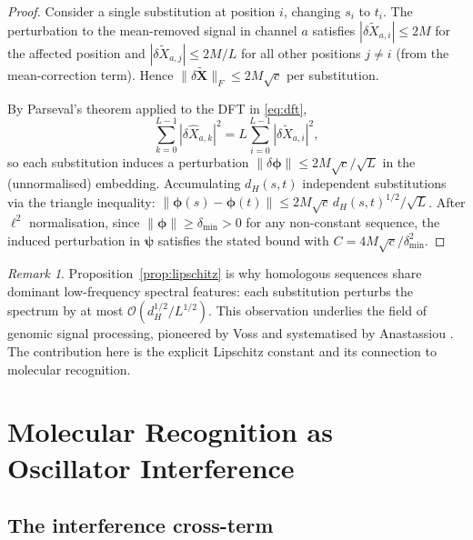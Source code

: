 \documentclass[twocolumn,11pt,a4paper]{article}
\theoremstyle{definition}
\theoremstyle{remark}
\newtheorem{remark}[theorem]{Remark}
\begin{document}
\begin{proof}
Consider a single substitution at position $i$, changing $s_i$ to $t_i$.
The perturbation to the mean-removed signal in channel $a$ satisfies
$|\delta\widetilde{X}_{a,i}| \leq 2M$ for the affected position and
$|\delta\widetilde{X}_{a,j}| \leq 2M/L$ for all other positions $j \neq i$
(from the mean-correction term). Hence
$\|\delta\widetilde{\mathbf{X}}\|_F \leq 2M\sqrt{c}$ per substitution.

By Parseval's theorem applied to the DFT in \eqref{eq:dft},
\[
  \sum_{k=0}^{L-1}|\delta\widehat{X}_{a,k}|^2
  = L\sum_{i=0}^{L-1}|\delta\widetilde{X}_{a,i}|^2,
\]
so each substitution induces a perturbation
$\|\delta\bm{\phi}\| \leq 2M\sqrt{c}/\sqrt{L}$ in the (unnormalised)
embedding. Accumulating $d_H(s,t)$ independent substitutions via the
triangle inequality:
$\|\bm{\phi}(s) - \bm{\phi}(t)\| \leq 2M\sqrt{c}\,d_H(s,t)^{1/2}/\sqrt{L}$.
After $\ell^2$ normalisation, since $\|\bm{\phi}\| \geq \delta_{\min} > 0$
for any non-constant sequence, the induced perturbation in $\bm{\psi}$
satisfies the stated bound with $C = 4M\sqrt{c}/\delta_{\min}^2$.
\end{proof}

\begin{remark}
Proposition~\ref{prop:lipschitz} is why homologous sequences share dominant
low-frequency spectral features: each substitution perturbs the spectrum by at
most $\mathcal{O}(d_H^{1/2}/L^{1/2})$. This observation underlies the
field of genomic signal processing, pioneered by Voss \citep{voss1992} and
systematised by Anastassiou \citep{anastassiou2001}. The contribution here is
the explicit Lipschitz constant and its connection to molecular recognition.
\end{remark}

\section{Molecular Recognition as Oscillator Interference}
\label{sec:recognition}

\subsection{The interference cross-term}
\label{sec:cross_term}
\end{document}
